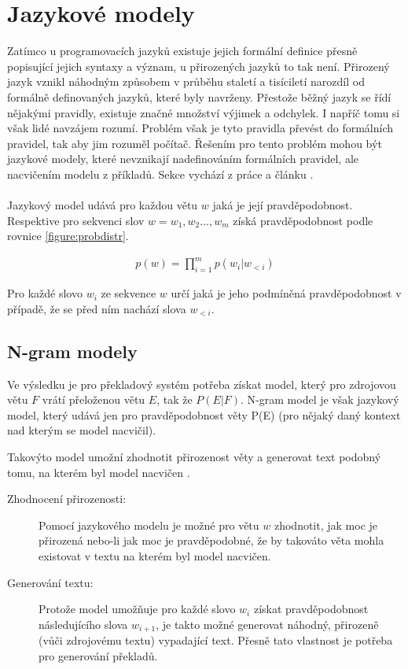 \section{Jazykové modely}\label{section:langmodel}
Zatímco u programovacích jazyků existuje jejich formální definice přesně popisující jejich syntaxy a význam, u přirozených jazyků to tak není. Přirozený jazyk vznikl náhodným způsobem v průběhu staletí a tisíciletí narozdíl od formálně definovaných jazyků, které byly navrženy. Přestože běžný jazyk se řídí nějakými pravidly, existuje značné množství výjimek a odchylek. I napříč tomu si však lidé navzájem rozumí. Problém však je tyto pravidla převést do formálních pravidel, tak aby jim rozuměl počítač. Řešením pro tento problém mohou být jazykové modely, které nevznikají nadefinováním formálních pravidel, ale nacvičením modelu z příkladů. Sekce vychází z práce \cite{nmtThesis} a článku \cite{nmtTutorial}.
\\\\
Jazykový model udává pro každou větu $w$ jaká je její pravděpodobnost. Respektive pro sekvenci slov $w = w_1, w_2..., w_m$ získá pravděpodobnost podle rovnice \ref{figure:probdistr}.

\begin{align}\label{figure:probdistr}
  p(w) = \prod_{i=1}^{m} p(w_i|w_{<i})
\end{align}

Pro každé slovo $w_i$ ze sekvence $w$ určí jaká je jeho podmíněná pravděpodobnost v případě, že se před ním nachází slova $w_{<i}$.

\subsection{N-gram modely}\label{subsection:ngram}
Ve výsledku je pro překladový systém potřeba získat model, který pro zdrojovou větu $F$ vrátí přeloženou větu $E$, tak že $P(E|F)$. N-gram model je však jazykový model, který udává jen pro pravděpodobnost věty P(E) (pro nějaký daný kontext nad kterým se model nacvičil).

Takovýto model umožní zhodnotit přirozenost věty a generovat text podobný tomu, na kterém byl model nacvičen \cite{nmtTutorial}.

\begin{description}
  \item[Zhodnocení přirozenosti:] Pomocí jazykového modelu je možné pro větu $w$ zhodnotit, jak moc je přirozená nebo-li jak moc je pravděpodobné, že by takováto věta mohla existovat v textu na kterém byl model nacvičen.
  \item[Generování textu:] Protože model umožňuje pro každé slovo $w_i$ získat pravděpodobnost následujícího slova $w_{i+1}$, je takto možné generovat náhodný, přirozeně (vůči zdrojovému textu) vypadající text. Přesně tato vlastnost je potřeba pro generování překladů.
\end{description}

